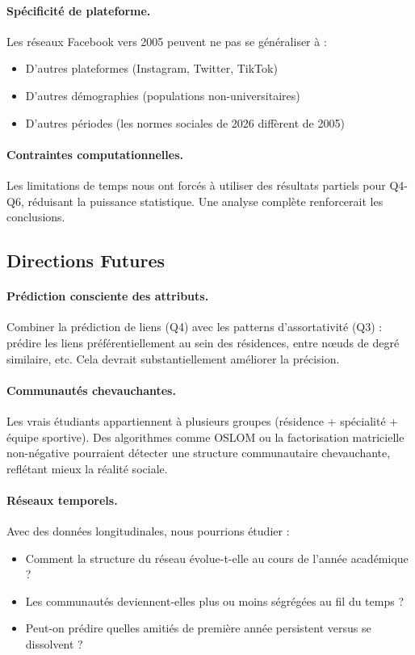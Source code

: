 \documentclass[12pt,a4paper]{article}
\begin{document}
\paragraph{Spécificité de plateforme.} Les réseaux Facebook vers 2005 peuvent ne pas se généraliser à :
\begin{itemize}
    \item D'autres plateformes (Instagram, Twitter, TikTok)
    \item D'autres démographies (populations non-universitaires)
    \item D'autres périodes (les normes sociales de 2026 diffèrent de 2005)
\end{itemize}

\paragraph{Contraintes computationnelles.} Les limitations de temps nous ont forcés à utiliser des résultats partiels pour Q4-Q6, réduisant la puissance statistique. Une analyse complète renforcerait les conclusions.

\subsection{Directions Futures}

\paragraph{Prédiction consciente des attributs.} Combiner la prédiction de liens (Q4) avec les patterns d'assortativité (Q3) : prédire les liens préférentiellement au sein des résidences, entre nœuds de degré similaire, etc. Cela devrait substantiellement améliorer la précision.

\paragraph{Communautés chevauchantes.} Les vrais étudiants appartiennent à plusieurs groupes (résidence + spécialité + équipe sportive). Des algorithmes comme OSLOM ou la factorisation matricielle non-négative pourraient détecter une structure communautaire chevauchante, reflétant mieux la réalité sociale.

\paragraph{Réseaux temporels.} Avec des données longitudinales, nous pourrions étudier :
\begin{itemize}
    \item Comment la structure du réseau évolue-t-elle au cours de l'année académique ?
    \item Les communautés deviennent-elles plus ou moins ségrégées au fil du temps ?
    \item Peut-on prédire quelles amitiés de première année persistent versus se dissolvent ?
\end{itemize}
\end{document}
